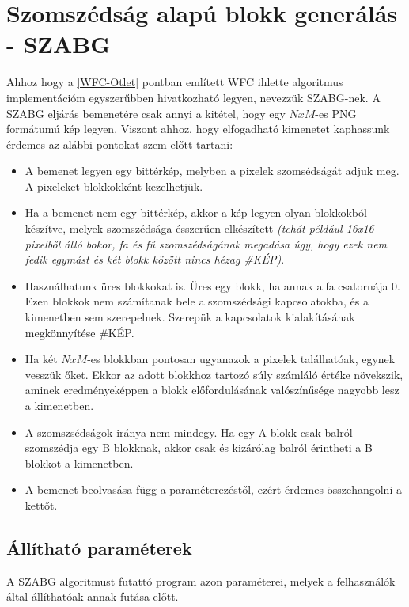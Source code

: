 \section{Szomszédság alapú blokk generálás - SZABG}
Ahhoz hogy a \ref{WFC-Otlet} pontban említett WFC ihlette algoritmus implementációm egyszerűbben hivatkozható legyen, nevezzük SZABG-nek.
A SZABG eljárás bemenetére csak annyi a kitétel, hogy egy $NxM$-es PNG formátumú kép legyen. Viszont ahhoz, hogy elfogadható kimenetet kaphassunk érdemes az alábbi pontokat szem előtt tartani:
\begin{itemize}
    \item A bemenet legyen egy bittérkép, melyben a pixelek szomsédságát adjuk meg. A pixeleket blokkokként kezelhetjük.
    \item Ha a bemenet nem egy bittérkép, akkor a kép legyen olyan blokkokból készítve, melyek szomszédsága ésszerűen elkészített \textit{(tehát például 16x16 pixelből álló bokor, fa és fű szomszédságának megadása úgy, hogy ezek nem fedik egymást és két blokk között nincs hézag \#KÉP)}.
    \item Használhatunk üres blokkokat is. Üres egy blokk, ha annak alfa csatornája 0. Ezen blokkok nem számítanak bele a szomszédsági kapcsolatokba, és a kimenetben sem szerepelnek. Szerepük a kapcsolatok kialakításának megkönnyítése \#KÉP.
    \item Ha két $NxM$-es blokkban pontosan ugyanazok a pixelek találhatóak, egynek vesszük őket. Ekkor az adott blokkhoz tartozó súly számláló értéke növekszik, aminek eredményeképpen a blokk előfordulásának valószínűsége nagyobb lesz a kimenetben.
    \item A szomszsédságok iránya nem mindegy. Ha egy A blokk csak balról szomszédja egy B blokknak, akkor csak és kizárólag balról érintheti a B blokkot a kimenetben.
    \item A bemenet beolvasása függ a paraméterezéstől, ezért érdemes összehangolni a kettőt.
\end{itemize}

\subsection{Állítható paraméterek}
A SZABG algoritmust futattó program azon paraméterei, melyek a felhasználók által állíthatóak annak futása előtt.
